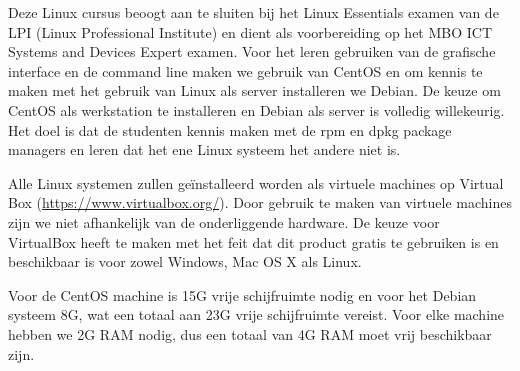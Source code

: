 Deze Linux cursus beoogt aan te sluiten bij het Linux Essentials examen van de LPI (Linux Professional Institute) en dient als voorbereiding op het MBO ICT Systems and Devices Expert examen. Voor het leren gebruiken van de grafische interface en de command line maken we gebruik van CentOS en om kennis te maken met het gebruik van Linux als server installeren we Debian. De keuze om CentOS als werkstation te installeren en Debian als server is volledig willekeurig. Het doel is dat de studenten kennis maken met de rpm en dpkg package managers en leren dat het ene Linux systeem het andere niet is.

Alle Linux systemen zullen ge\"installeerd worden als virtuele machines op Virtual Box (\url{https://www.virtualbox.org/}). Door gebruik te maken van virtuele machines zijn we niet afhankelijk van de onderliggende hardware. De keuze voor VirtualBox heeft te maken met het feit dat dit product gratis te gebruiken is en beschikbaar is voor zowel Windows, Mac OS X als Linux.

Voor de CentOS machine is 15G vrije schijfruimte nodig en voor het Debian systeem 8G, wat een totaal aan 23G vrije schijfruimte vereist. Voor elke machine hebben we 2G RAM nodig, dus een totaal van 4G RAM moet vrij beschikbaar zijn.
